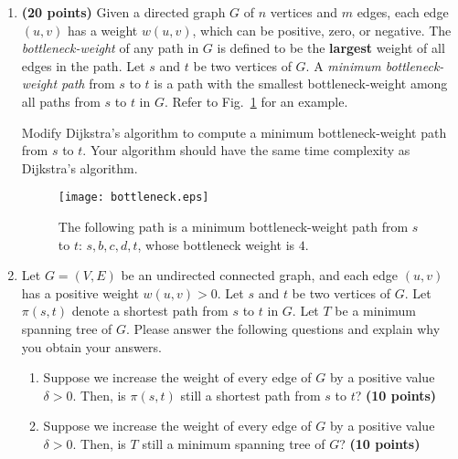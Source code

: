 \documentclass[11pt]{article}
\begin{document}
\begin{enumerate}

\item
{\bf (20 points)}
Given a directed graph $G$ of $n$ vertices and $m$ edges, each edge $(u,v)$ has a weight $w(u,v)$, which can be positive, zero, or negative.
The {\em bottleneck-weight} of any path in $G$ is defined to be the
{\bf largest} weight of all edges in the path. Let $s$ and $t$ be two vertices of $G$. A {\em minimum bottleneck-weight path} from $s$ to $t$ is a path with the smallest bottleneck-weight among all paths from $s$ to $t$ in $G$. Refer to Fig.~\ref{fig:bottleneck} for an example.


Modify Dijkstra's algorithm to compute a  minimum bottleneck-weight path from $s$ to $t$. Your algorithm should have the same time complexity as Dijkstra's algorithm.


\begin{figure}[h]
\begin{minipage}[t]{\linewidth}
\begin{center}
\texttt{[image: bottleneck.eps]}
\caption{\footnotesize The following path is a minimum bottleneck-weight path from $s$ to $t$: $s,b,c,d,t$, whose bottleneck weight is $4$.}\label{fig:bottleneck}
\end{center}
\end{minipage}
\end{figure}





\item
Let $G=(V,E)$ be an undirected connected graph, and each edge $(u,v)$ has a positive weight $w(u,v)>0$. Let $s$ and $t$ be two vertices of $G$. Let $\pi(s,t)$ denote a shortest path from $s$ to $t$ in $G$. Let $T$ be a minimum spanning tree of $G$. Please answer the following questions and explain why you obtain your answers.

\begin{enumerate}
\item
Suppose we increase the weight of every edge of $G$ by a positive value $\delta>0$. Then, is $\pi(s,t)$ still a shortest path from $s$ to $t$?
{\hfill \bf (10 points)}



\item
Suppose we increase the weight of every edge of $G$ by a positive value $\delta>0$. Then, is $T$ still a minimum spanning tree of $G$?
{\hfill \bf (10 points)}


\end{enumerate}
\end{enumerate}
\end{document}

